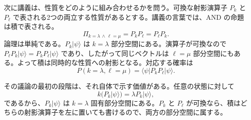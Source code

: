 \begin{classroomqa}
\end{classroomqa}

\begin{classroomqa}
\end{classroomqa}

\begin{classroomqa}
\end{classroomqa}

次に講義は、性質をどのように組み合わせるかを問う。可換な射影演算子 \(P_k\) と \(P_\ell\) で表される2つの両立する性質があるとする。講義の言葉では、AND の命題は積で表される。
\begin{equation}
\Pi_{k=\lambda\,\wedge\,\ell=\mu}=P_kP_\ell=P_\ell P_k.
\end{equation}
論理は単純である。\(P_k|\psi\rangle\) は \(k=\lambda\) 部分空間にある。演算子が可換なので \(P_\ell P_k|\psi\rangle=P_kP_\ell|\psi\rangle\) であり、したがって同じベクトルは \(\ell=\mu\) 部分空間にもある。よって積は同時的な性質への射影となる。対応する確率は
\begin{equation}
P(k=\lambda,\ell=\mu)=\langle\psi|P_kP_\ell|\psi\rangle.
\end{equation}

その議論の最初の段階は、それ自体で示す価値がある。任意の状態に対して
\begin{equation}
k\bigl(P_k|\psi\rangle\bigr)=\lambda P_k|\psi\rangle,
\end{equation}
であるから、\(P_k|\psi\rangle\) は \(k=\lambda\) 固有部分空間にある。\(P_k\) と \(P_\ell\) が可換なら、積はどちらの射影演算子を左に置いても書けるので、両方の部分空間に属する。

